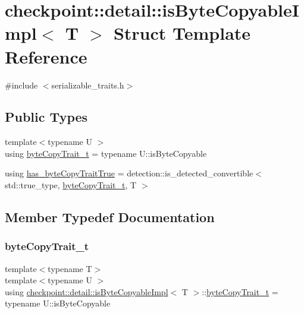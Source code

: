 \hypertarget{structcheckpoint_1_1detail_1_1is_byte_copyable_impl}{}\section{checkpoint\+:\+:detail\+:\+:is\+Byte\+Copyable\+Impl$<$ T $>$ Struct Template Reference}
\label{structcheckpoint_1_1detail_1_1is_byte_copyable_impl}


{\ttfamily \#include $<$serializable\+\_\+traits.\+h$>$}

\subsection*{Public Types}
\begin{DoxyCompactItemize}
\item 
{\footnotesize template$<$typename U $>$ }\\using \hyperlink{structcheckpoint_1_1detail_1_1is_byte_copyable_impl_a5ac4b9b4645bc6cfb4e68877719de938}{byte\+Copy\+Trait\+\_\+t} = typename U\+::is\+Byte\+Copyable
\item 
using \hyperlink{structcheckpoint_1_1detail_1_1is_byte_copyable_impl_a2370db16994d2162a2806de74f322978}{has\+\_\+byte\+Copy\+Trait\+True} = detection\+::is\+\_\+detected\+\_\+convertible$<$ std\+::true\+\_\+type, \hyperlink{structcheckpoint_1_1detail_1_1is_byte_copyable_impl_a5ac4b9b4645bc6cfb4e68877719de938}{byte\+Copy\+Trait\+\_\+t}, T $>$
\end{DoxyCompactItemize}


\subsection{Member Typedef Documentation}
\mbox{\label{structcheckpoint_1_1detail_1_1is_byte_copyable_impl_a5ac4b9b4645bc6cfb4e68877719de938}} 
\subsubsection{\texorpdfstring{byte\+Copy\+Trait\+\_\+t}{byteCopyTrait\_t}}
{\footnotesize\ttfamily template$<$typename T$>$ \\
template$<$typename U $>$ \\
using \hyperlink{structcheckpoint_1_1detail_1_1is_byte_copyable_impl}{checkpoint\+::detail\+::is\+Byte\+Copyable\+Impl}$<$ T $>$\+::\hyperlink{structcheckpoint_1_1detail_1_1is_byte_copyable_impl_a5ac4b9b4645bc6cfb4e68877719de938}{byte\+Copy\+Trait\+\_\+t} =  typename U\+::is\+Byte\+Copyable}

